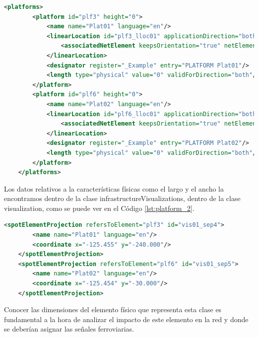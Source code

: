     \begin{lstlisting}[language = XML, caption = Clase Platform , label = {lst:platform_1}]
    <platforms>
        <platform id="plf3" height="0">
            <name name="Plat01" language="en"/>
            <linearLocation id="plf3_lloc01" applicationDirection="both">
                <associatedNetElement keepsOrientation="true" netElementRef="ne1"/>
            </linearLocation>
            <designator register="_Example" entry="PLATFORM Plat01"/>
            <length type="physical" value="0" validForDirection="both"/>
        </platform>
        <platform id="plf6" height="0">
            <name name="Plat02" language="en"/>
            <linearLocation id="plf6_lloc01" applicationDirection="both">
                <associatedNetElement keepsOrientation="true" netElementRef="ne3"/>
            </linearLocation>
            <designator register="_Example" entry="PLATFORM Plat02"/>
            <length type="physical" value="0" validForDirection="both"/>
        </platform>
    </platforms>
    \end{lstlisting}

    Los datos relativos a la características físicas como el largo y el ancho la encontramos dentro de la clase infrastructureVisualizations, dentro de la clase visualization, como se puede ver en el Código \ref{lst:platform_2}.

    \begin{lstlisting}[language = XML, caption = Clase visualization , label = {lst:platform_2}]
    <spotElementProjection refersToElement="plf3" id="vis01_sep4">
        <name name="Plat01" language="en"/>
        <coordinate x="-125.455" y="-240.000"/>
    </spotElementProjection>
    <spotElementProjection refersToElement="plf6" id="vis01_sep5">
        <name name="Plat02" language="en"/>
        <coordinate x="-125.454" y="-30.000"/>
    </spotElementProjection>
    \end{lstlisting}

    Conocer las dimensiones del elemento físico que representa esta clase es fundamental a la hora de analizar el impacto de este elemento en la red y donde se deberían asignar las señales ferroviarias.